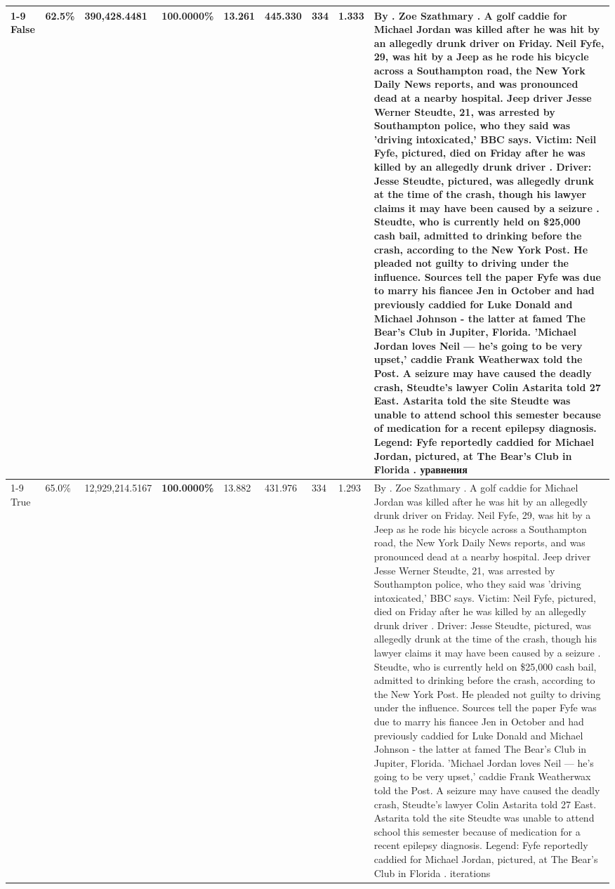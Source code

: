 \begin{table}[H]
\begin{tabular}{lllrlllll}
\cline{1-9}
False & 62.5\% & 390,428.4481 & \bfseries \color{red} 100.0000\% & 13.261 & 445.330 & 334 & 1.333 & By . Zoe Szathmary . A golf caddie for Michael Jordan was killed after he was hit by an allegedly drunk driver on Friday. Neil Fyfe, 29, was hit by a Jeep as he rode his bicycle across a Southampton road, the New York Daily News reports, and was pronounced dead at a nearby hospital. Jeep driver Jesse Werner Steudte, 21, was arrested by Southampton police, who they said was 'driving intoxicated,' BBC says. Victim: Neil Fyfe, pictured, died on Friday after he was killed by an allegedly drunk driver . Driver: Jesse Steudte, pictured, was allegedly drunk at the time of the crash, though his lawyer claims it may have been caused by a seizure . Steudte, who is currently held on \$25,000 cash bail, admitted to drinking before the crash, according to the New York Post. He pleaded not guilty to driving under the influence. Sources tell the paper Fyfe was due to marry his fiancee Jen in October and had previously caddied for Luke Donald and Michael Johnson - the latter at famed The Bear's Club in Jupiter, Florida. 'Michael Jordan loves Neil — he’s going to be very upset,' caddie Frank Weatherwax told the Post. A seizure may have caused the deadly crash, Steudte's lawyer Colin Astarita told 27 East. Astarita told the site Steudte was unable to attend school this semester because of medication for a recent epilepsy diagnosis. Legend: Fyfe reportedly caddied for Michael Jordan, pictured, at The Bear's Club in Florida . уравнения \\
\cline{1-9}
True & 65.0\% & 12,929,214.5167 & \bfseries \color{red} 100.0000\% & 13.882 & 431.976 & 334 & 1.293 & By . Zoe Szathmary . A golf caddie for Michael Jordan was killed after he was hit by an allegedly drunk driver on Friday. Neil Fyfe, 29, was hit by a Jeep as he rode his bicycle across a Southampton road, the New York Daily News reports, and was pronounced dead at a nearby hospital. Jeep driver Jesse Werner Steudte, 21, was arrested by Southampton police, who they said was 'driving intoxicated,' BBC says. Victim: Neil Fyfe, pictured, died on Friday after he was killed by an allegedly drunk driver . Driver: Jesse Steudte, pictured, was allegedly drunk at the time of the crash, though his lawyer claims it may have been caused by a seizure . Steudte, who is currently held on \$25,000 cash bail, admitted to drinking before the crash, according to the New York Post. He pleaded not guilty to driving under the influence. Sources tell the paper Fyfe was due to marry his fiancee Jen in October and had previously caddied for Luke Donald and Michael Johnson - the latter at famed The Bear's Club in Jupiter, Florida. 'Michael Jordan loves Neil — he’s going to be very upset,' caddie Frank Weatherwax told the Post. A seizure may have caused the deadly crash, Steudte's lawyer Colin Astarita told 27 East. Astarita told the site Steudte was unable to attend school this semester because of medication for a recent epilepsy diagnosis. Legend: Fyfe reportedly caddied for Michael Jordan, pictured, at The Bear's Club in Florida . iterations \\

\end{tabular}
\end{table}
